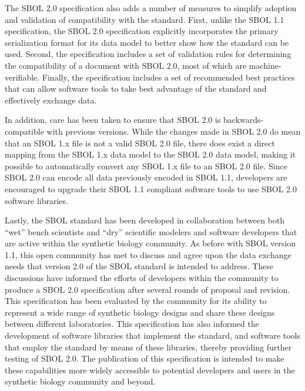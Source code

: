The SBOL 2.0 specification also adds a number of measures to simplify adoption and validation of compatibility with the standard.
First, unlike the SBOL 1.1 specification, the SBOL 2.0 specification explicitly incorporates the primary serialization format for its data model to better show how the standard can be used. Second, the specification includes a set of validation rules for determining the compatibility of a document with SBOL 2.0, most of which are machine-verifiable. Finally, the specification includes a set of recommended best practices that can allow software tools to take best advantage of the standard and effectively exchange data.

In addition, care has been taken to ensure that SBOL 2.0 is backwards-compatible with previous versions. While the changes made in SBOL 2.0 do mean   that an SBOL 1.x file is not a valid SBOL 2.0 file, there does exist a direct mapping from the SBOL 1.x data model to the SBOL 2.0 data model, making it possible to automatically convert any SBOL 1.x file to an SBOL 2.0 file.
Since SBOL 2.0 can encode all data previously encoded in SBOL 1.1, developers are encouraged to upgrade their SBOL 1.1 compliant software tools to use SBOL 2.0 software libraries. 

Lastly, the SBOL standard has been developed in collaboration between both ``wet'' bench scientists and ``dry'' scientific modelers and software developers that are active within the synthetic biology community. 
As before with SBOL version 1.1, this open community has met to discuss and agree upon the data exchange needs that version 2.0 of the SBOL standard is intended to address. 
These discussions have informed the efforts of  developers within the community to produce a SBOL 2.0 specification after several rounds of proposal and revision. This specification has been evaluated by the community for its ability to represent a wide range of synthetic biology designs and share these designs between different laboratories. 
This specification has also informed the development of software libraries that implement the standard, and software tools that employ the standard by means of these libraries, thereby providing further testing of SBOL 2.0. 
The publication of this specification is intended to make these capabilities more widely accessible to potential developers and users in the synthetic biology community and beyond.